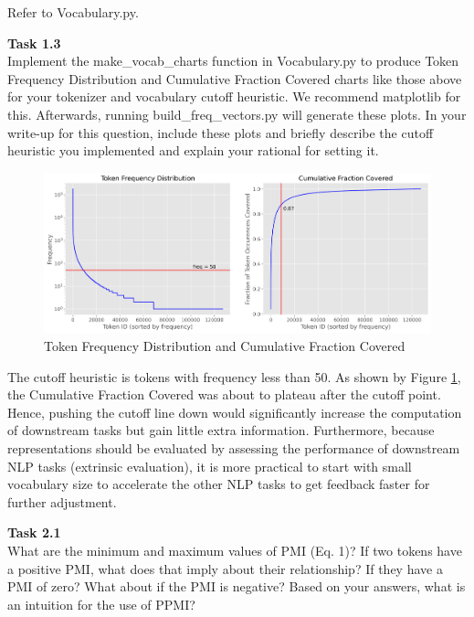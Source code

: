 \documentclass[12pt,article]{article}
\newenvironment{task}[2][Task]
    { \begin{mdframed}[backgroundcolor=gray!20] \textbf{#1 #2} \\}
    {  \end{mdframed}}
\begin{document}
Refer to Vocabulary.py.

\begin{task}{1.3} 
Implement the make\_vocab\_charts function in Vocabulary.py to produce Token Frequency Distribution and Cumulative Fraction Covered charts like those above for your tokenizer and vocabulary cutoff heuristic. We recommend matplotlib for this. Afterwards, running build\_freq\_vectors.py will generate these plots. In your write-up for this question, include these plots and briefly describe the cutoff heuristic you implemented and explain your rational for setting it.
\end{task}

\begin{figure}[H]
    \centering
    \includegraphics[scale=0.5]{token_freq_dist.png} \par
    \caption{Token Frequency Distribution and Cumulative Fraction Covered}
    \label{fig:q1-token-freq-dist}
\end{figure}

The cutoff heuristic is tokens with frequency less than 50. As shown by Figure \ref{fig:q1-token-freq-dist}, the Cumulative Fraction Covered was about to plateau after the cutoff point. Hence, pushing the cutoff line down would significantly increase the computation of downstream tasks but gain little extra information. Furthermore, because representations should be evaluated by assessing the performance of downstream NLP tasks (extrinsic evaluation), it is more practical to start with small vocabulary size to accelerate the other NLP tasks to get feedback faster for further adjustment.

\newpage
\begin{task}{2.1}
What are the minimum and maximum values of PMI (Eq. 1)? If two tokens have a positive PMI, what does that imply about their relationship? If they have a PMI of zero? What about if the PMI is negative? Based on your answers, what is an intuition for the use of PPMI?
\end{task}
\end{document}
